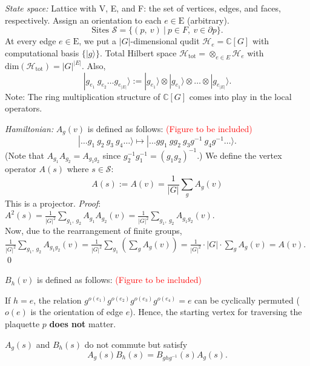 \documentclass[11pt, a4paper]{article}
\begin{document}
\textit{State space:} Lattice with V, E, and F: the set of vertices, edges, and faces, respectively. Assign an orientation to each $e \in \mathrm{E}$ (arbitrary).
\begin{equation*}
    \text{Sites } \mathcal{S} = \{(p,~v)~|~p \in F,~v \in \partial p\}.
\end{equation*}
At every edge $e \in \mathrm{E}$, we put a $|G|$-dimensional qudit $\mathcal{H}_e = \mathbb{C}[G]$ with computational basis $\{|g\rangle\}$. Total Hilbert space $\mathcal{H}_\text{tot} = \otimes_{e \in E} \mathcal{H}_e$ with $\text{dim}(\mathcal{H}_\text{tot}) = |G|^{|E|}$. Also,
\begin{equation*}
    |g_{e_1}~g_{e_2} \dots g_{e_{|E|}}\rangle := |g_{e_1}\rangle \otimes |g_{e_1}\rangle \otimes \dots \otimes |g_{e_{|E|}}\rangle.
\end{equation*}
Note: The ring multiplication structure of $\mathbb{C}[G]$ comes into play in the local operators.

\textit{Hamiltonian:} $A_g(v)$ is defined as follows: \textcolor{red}{(Figure to be included)}
\begin{equation*}
    |\dots g_1~g_2~g_3~g_4\dots\rangle \mapsto |\dots gg_1~gg_2~g_3g^{-1}~g_4g^{-1}\dots\rangle.
\end{equation*}
(Note that $A_{g_1}A_{g_2} = A_{g_1g_2}$ since $g_2^{-1}g_1^{-1} = (g_1g_2)^{-1}$.)
We define the vertex operator $A(s)$ where $s \in \mathcal{S}$:
\begin{equation*}
    A(s) := A(v) = \frac{1}{|G|}\sum_g A_g(v)
\end{equation*}
This is a projector. \textit{Proof}: $A^2(s) = \frac{1}{|G|^2}\sum_{g_1,~g_2}A_{g_1}A_{g_2}(v) = \frac{1}{|G|^2}\sum_{g_1,~g_2}A_{g_1g_2}(v)$.\\
Now, due to the rearrangement of finite groups, $\frac{1}{|G|^2}\sum_{g_1,~g_2}A_{g_1g_2}(v) = \frac{1}{|G|^2}\sum_{g_1}\left(\sum_gA_{g}(v)\right) = \frac{1}{|G|^2}\cdot|G|\cdot \sum_g A_g(v) = A(v)$. \qed

$B_h(v)$ is defined as follows: \textcolor{red}{(Figure to be included)}

If $h = e$, the relation $g^{o(e_1)}g^{o(e_2)}g^{o(e_3)}g^{o(e_4)} = e$ can be cyclically permuted ($o(e)$ is the orientation of edge $e$). Hence, the starting vertex for traversing the plaquette $p$ \textbf{does not} matter.

$A_g(s)$ and $B_h(s)$ do not commute but satisfy \begin{equation}
    A_g(s)B_h(s) = B_{ghg^{-1}}(s)A_g(s).
\end{equation}
\end{document}
